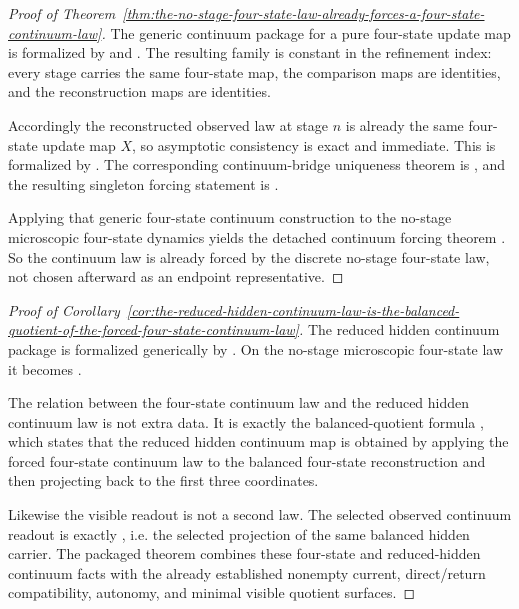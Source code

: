 \begin{proof}[Proof of Theorem~\ref{thm:the-no-stage-four-state-law-already-forces-a-four-state-continuum-law}]
\label{proof:thm:the-no-stage-four-state-law-already-forces-a-four-state-continuum-law}
The generic continuum package for a pure four-state update map is formalized by
 and
. The resulting family is
constant in the refinement index: every stage carries the same four-state map,
the comparison maps are identities, and the reconstruction maps are identities.

Accordingly the reconstructed observed law at stage \(n\) is already the same
four-state update map \(X\), so asymptotic consistency is exact and immediate.
This is formalized by
. The corresponding
continuum-bridge uniqueness theorem is
, and the resulting
singleton forcing statement is
.

Applying that generic four-state continuum construction to the no-stage
microscopic four-state dynamics
 yields the detached
continuum forcing theorem
. So the
continuum law is already forced by the discrete no-stage four-state law, not
chosen afterward as an endpoint representative.
\end{proof}

\begin{proof}[Proof of Corollary~\ref{cor:the-reduced-hidden-continuum-law-is-the-balanced-quotient-of-the-forced-four-state-continuum-law}]
\label{proof:cor:the-reduced-hidden-continuum-law-is-the-balanced-quotient-of-the-forced-four-state-continuum-law}
The reduced hidden continuum package is formalized generically by
. On the
no-stage microscopic four-state law it becomes
.

The relation between the four-state continuum law and the reduced hidden
continuum law is not extra data. It is exactly the balanced-quotient formula
,
which states that the reduced hidden continuum map is obtained by applying the
forced four-state continuum law to the balanced four-state reconstruction and
then projecting back to the first three coordinates.

Likewise the visible readout is not a second law. The selected observed
continuum readout is exactly
, i.e. the
selected projection of the same balanced hidden carrier. The packaged theorem
 combines these
four-state and reduced-hidden continuum facts with the already established
nonempty current, direct/return compatibility, autonomy, and minimal visible
quotient surfaces.
\end{proof}

